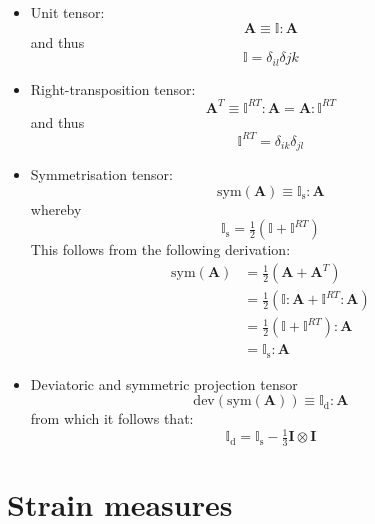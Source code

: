 \documentclass{goose-article}
\begin{document}
\begin{itemize}
%
\item Unit tensor:
\begin{equation}
  \bm{A} \equiv \mathbb{I} : \bm{A}
\end{equation}
and thus
\begin{equation}
  \mathbb{I} = \delta_{il} \delta{jk}
\end{equation}
%
\item Right-transposition tensor:
\begin{equation}
  \bm{A}^T \equiv \mathbb{I}^{RT} : \bm{A} = \bm{A} : \mathbb{I}^{RT}
\end{equation}
and thus
\begin{equation}
  \mathbb{I}^{RT} = \delta_{ik} \delta_{jl}
\end{equation}
%
\item Symmetrisation tensor:
\begin{equation}
  \mathrm{sym} \left( \bm{A} \right) \equiv \mathbb{I}_\mathrm{s} : \bm{A}
\end{equation}
whereby
\begin{equation}
  \mathbb{I}_\mathrm{s} = \tfrac{1}{2} \left( \mathbb{I} + \mathbb{I}^{RT} \right)
\end{equation}
This follows from the following derivation:
\begin{align}
  \mathrm{sym} \left( \bm{A} \right) &= \tfrac{1}{2} \left( \bm{A} + \bm{A}^T \right)
  \\
  &= \tfrac{1}{2} \left( \mathbb{I} : \bm{A} + \mathbb{I}^{RT} : \bm{A} \right)
  \\
  &= \tfrac{1}{2} \left( \mathbb{I} + \mathbb{I}^{RT} \right) : \bm{A}
  \\
  &= \mathbb{I}_\mathrm{s} : \bm{A}
\end{align}
%
\item Deviatoric and symmetric projection tensor
\begin{equation}
  \mathrm{dev} \left( \mathrm{sym} \left( \bm{A} \right) \right) \equiv \mathbb{I}_\mathrm{d} : \bm{A}
\end{equation}
from which it follows that:
\begin{equation}
  \mathbb{I}_\mathrm{d}
  = \mathbb{I}_\mathrm{s} - \tfrac{1}{3} \bm{I} \otimes \bm{I}
\end{equation}
%
\end{itemize}

\section{Strain measures}
\label{sec:ap:strain}
\end{document}
